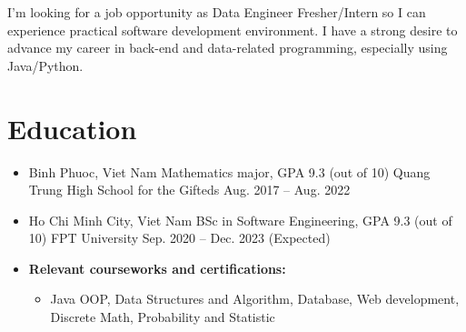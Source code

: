 \documentclass[11pt,a4paper,sans]{moderncv}        %
\begin{document}
\makecvtitle 
\vspace{-25pt}
I'm looking for a job opportunity as Data Engineer Fresher/Intern so I can experience practical software development environment. I have a strong desire to advance my career in back-end and data-related programming, especially using Java/Python.\\


\vspace{-20pt}
\section{Education}

\begin{itemize}

\item{
\cventry
{Binh Phuoc, Viet Nam}
{Mathematics major, GPA 9.3 (out of 10)}
{Quang Trung High School for the Gifteds}
{Aug. 2017 -- Aug. 2022}{}{
}}

\item{
\cventry
{Ho Chi Minh City, Viet Nam}
{BSc in Software Engineering, GPA 9.3 (out of 10)}
{FPT University}
{Sep. 2020 -- Dec. 2023 (Expected)}{}{
}}

\item{
 \textbf{Relevant courseworks and certifications:} 
 {\vspace{1pt}
\begin{itemize}
\item  Java OOP, Data Structures and Algorithm, Database, Web development, Discrete Math,  Probability and Statistic

\end{itemize}
}}
\end{itemize}

\vspace{-6pt}
\end{document}
